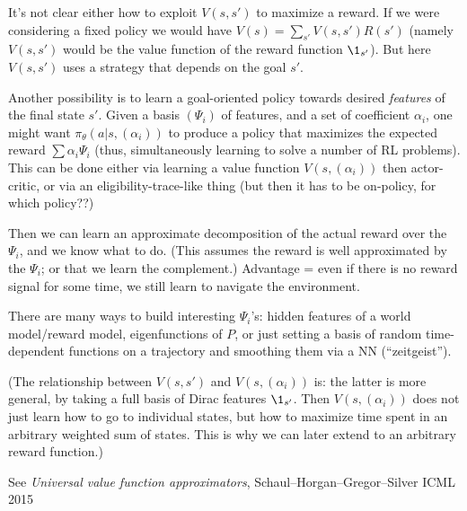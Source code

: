 \documentclass[11pt,a4paper]{article}
\begin{document}
It's not clear either how to exploit $V(s,s')$ to maximize a reward. If
we were considering a fixed policy we would have
$V(s)=\sum_{s'}V(s,s')R(s')$ (namely $V(s,s')$ would be the value
function of the reward function $\1_{s'}$). But here $V(s,s')$ uses a
strategy that depends on the goal $s'$.

Another possibility is to learn a goal-oriented policy towards desired
\emph{features} of the final state $s'$. Given a basis $(\Psi_i)$ of
features, and a set of coefficient $\alpha_i$, one might want
$\pi_\theta(a|s,(\alpha_i))$ to produce a policy that maximizes the
expected reward $\sum \alpha_i \Psi_i$ (thus, simultaneously learning to
solve a number of RL problems). 
This can be done either via learning a value function $V(s,(\alpha_i))$
then actor-critic, or via an eligibility-trace-like thing (but then it
has to be on-policy, for which policy??)

Then we can learn an approximate decomposition of the actual reward over
the $\Psi_i$, and we know what to do. (This assumes the reward is well
approximated by the $\Psi_i$; or that we learn the complement.) Advantage
= even if there is no reward signal for some time, we still learn to
navigate the environment.

There are many ways to build interesting
$\Psi_i$'s: hidden features of a world model/reward model, eigenfunctions
of $P$, or just setting a basis of random time-dependent functions on a
trajectory and smoothing them via a NN (``zeitgeist'').

(The relationship between $V(s,s')$ and $V(s,(\alpha_i))$ is: the latter
is more general, by taking a full basis of Dirac features $\1_{s'}$. Then
$V(s,(\alpha_i))$ does not just learn how to go to individual states, but
how to maximize time spent in an arbitrary weighted sum of states. This
is why we can later extend to an arbitrary reward function.)

See \emph{Universal value function approximators},
Schaul--Horgan--Gregor--Silver ICML 2015
\end{document}
